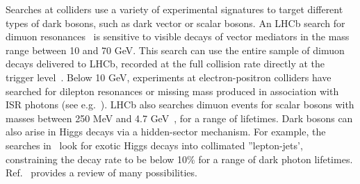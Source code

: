 

Searches at colliders use a variety of experimental signatures to target different types of dark bosons, such as dark vector or scalar bosons.
An LHCb search for dimuon resonances~\cite{Aaij:2017rft} is sensitive to visible decays of vector mediators in the mass range between 10 and 70 GeV.%
This search can use the entire sample of dimuon decays delivered to LHCb, recorded at the full collision rate directly at the trigger level~\cite{Aaij:2016rxn}. 
Below 10 GeV, experiments at electron-positron colliders have searched for dilepton resonances or missing mass produced in association with ISR photons (see e.g.~\cite{Lees:2014xha,Lees:2017lec}). %
LHCb also searches dimuon events for scalar bosons with masses between 250 MeV and 4.7 GeV~\cite{Aaij:2016qsm}, for a range of lifetimes.
%
Dark bosons can also arise in Higgs decays via a hidden-sector mechanism.
For example, the searches in~\cite{ATLAS:2016jza,CMS-PAS-HIG-16-035} look for exotic Higgs decays into collimated ''lepton-jets', constraining the decay rate to be below 10\% for a range of dark photon lifetimes. 
Ref.~\cite{Curtin:2014cca} provides a review of many possibilities.

